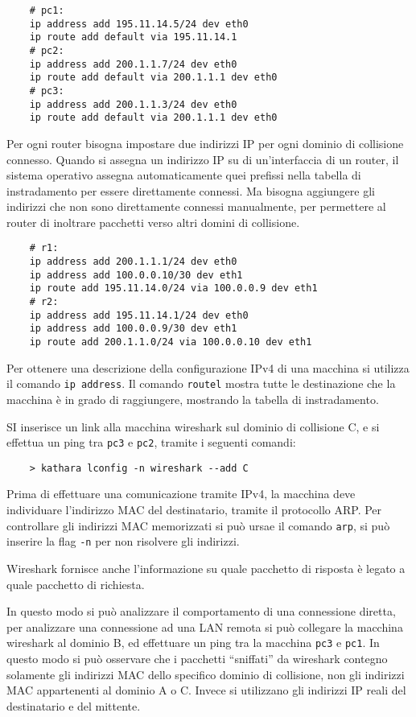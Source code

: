 \documentclass{article}
\numberwithin{equation}{subsection}
\begin{document}
\begin{verbatim}
    # pc1:
    ip address add 195.11.14.5/24 dev eth0
    ip route add default via 195.11.14.1
    # pc2:
    ip address add 200.1.1.7/24 dev eth0
    ip route add default via 200.1.1.1 dev eth0
    # pc3:
    ip address add 200.1.1.3/24 dev eth0
    ip route add default via 200.1.1.1 dev eth0
\end{verbatim}

Per ogni router bisogna impostare due indirizzi IP per ogni dominio di collisione connesso. Quando si assegna un indirizzo IP su di un'interfaccia di un router, 
il sistema operativo assegna automaticamente quei prefissi nella tabella di instradamento per essere direttamente connessi. 
Ma bisogna aggiungere gli indirizzi che non sono direttamente connessi manualmente, per permettere al router di inoltrare pacchetti verso altri domini di collisione. 
\begin{verbatim}
    # r1:
    ip address add 200.1.1.1/24 dev eth0
    ip address add 100.0.0.10/30 dev eth1
    ip route add 195.11.14.0/24 via 100.0.0.9 dev eth1
    # r2:
    ip address add 195.11.14.1/24 dev eth0
    ip address add 100.0.0.9/30 dev eth1
    ip route add 200.1.1.0/24 via 100.0.0.10 dev eth1
\end{verbatim}

Per ottenere una descrizione della configurazione IPv4 di una macchina si utilizza il comando \verb|ip address|. Il comando \verb|routel| mostra tutte le 
destinazione che la macchina è in grado di raggiungere, mostrando la tabella di instradamento. 

SI inserisce un link alla macchina wireshark sul dominio di collisione C, e si effettua un ping tra \verb|pc3| e \verb|pc2|, tramite i seguenti comandi:
\begin{verbatim}
    > kathara lconfig -n wireshark --add C
\end{verbatim}
Prima di effettuare una comunicazione tramite IPv4, la macchina deve individuare l'indirizzo MAC del destinatario, tramite il protocollo ARP. Per controllare 
gli indirizzi MAC memorizzati si può ursae il comando \verb|arp|, si può inserire la flag \verb|-n| per non risolvere gli indirizzi. 

Wireshark fornisce anche l'informazione su quale pacchetto di risposta è legato a quale pacchetto di richiesta. 


In questo modo si può analizzare il comportamento di una connessione diretta, per analizzare una connessione ad una LAN remota si può collegare la macchina 
wireshark al dominio B, ed effettuare un ping tra la macchina \verb|pc3| e \verb|pc1|. In questo modo si può osservare che i pacchetti ``sniffati'' da wireshark contegno 
solamente gli indirizzi MAC dello specifico dominio di collisione, non gli indirizzi MAC appartenenti al dominio A o C. Invece si utilizzano gli indirizzi IP 
reali del destinatario e del mittente. 
\end{document}
